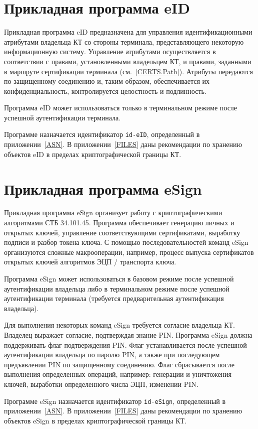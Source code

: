 \section{Прикладная программа eID}\label{OBJ.eID}

Прикладная программа eID предназначена для управления идентификационными
атрибутами владельца КТ со стороны терминала, представляющего некоторую
информационную систему.
%
Управление атрибутами осуществляется в соответствии с правами,
установленными владельцем КТ, и правами, заданными в маршруте сертификации
терминала (см.~\ref{CERTS.Path}).
%
Атрибуты передаются по защищенному соединению и, таким образом, обеспечивается 
их конфиденциальность, контролируется целостность и подлинность. 

Программа eID может использоваться только в терминальном режиме
после успешной аутентификации терминала. 

Программе назначается идентификатор \verb|id-eID|, определенный в
приложении~\ref{ASN}. В приложении~\ref{FILES} даны рекомендации по хранению
объектов eID в пределах криптографической границы КТ.

\section{Прикладная программа eSign}\label{OBJ.eSign}

Прикладная программа eSign организует работу с криптографическими 
алгоритмами СТБ 34.101.45. 
%
Программа обеспечивает генерацию личных и открытых 
ключей, управление соответствующими сертификатами, 
выработку подписи и разбор токена ключа.
%
С помощью последовательностей команд eSign организуются сложные макрооперации,  
например, процесс выпуска сертификатов открытых ключей алгоритмов ЭЦП / 
транспорта ключа. 

Программа eSign может использоваться в базовом режиме 
после успешной аутентификации владельца либо в терминальном режиме 
после успешной аутентификации терминала (требуется предварительная 
аутентификация владельца). 

Для выполнения некоторых команд eSign требуется согласие владельца КТ. 
Владелец выражает согласие, подтверждая знание PIN. Программа eSign должна 
поддерживать флаг подтверждения PIN.
%
Флаг устанавливается после успешной аутентификации владельца по паролю PIN, а 
также при последующем предъявлении PIN по защищенному соединению.  
%
Флаг сбрасывается после выполнения определенных операций, например:
генерации и уничтожения ключей, выработки определенного числа ЭЦП, 
изменении PIN.

Программе eSign назначается идентификатор \verb|id-eSign|, 
определенный в приложении~\ref{ASN}. В приложении~\ref{FILES}
даны рекомендации по хранению объектов eSign в пределах криптографической 
границы КТ.




